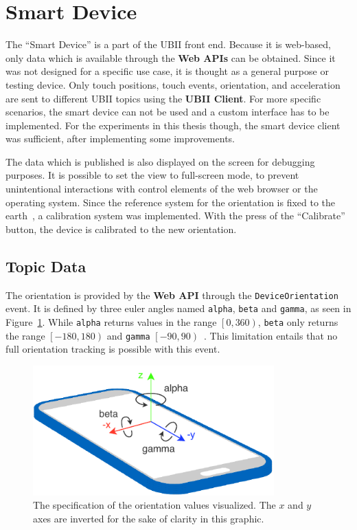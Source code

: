 \section{Smart Device}\label{section:smart-device}

The \enquote{Smart Device} is a part of the \ac{UBII} front end. Because it is web-based, only data which is available through the \textbf{Web \acp{API}} can be obtained. Since it was not designed for a specific use case, it is thought as a general purpose or testing device. Only touch positions, touch events, orientation, and acceleration are sent to different \ac{UBII} topics using the \textbf{\ac{UBII} Client}. For more specific scenarios, the smart device can not be used and a custom interface has to be implemented. For the experiments in this thesis though, the smart device client was sufficient, after implementing some improvements.

The data which is published is also displayed on the screen for debugging purposes. It is possible to set the view to full-screen mode, to prevent unintentional interactions with control elements of the web browser or the operating system. Since the reference system for the orientation is fixed to the earth~\cite[Chapter~4.1]{DevicesandSensorsWorkingGroup.2019}, a calibration system was implemented. With the press of the \enquote{Calibrate} button, the device is calibrated to the new orientation.


\subsection{Topic Data}\label{subsection:topic-data}

The orientation is provided by the \textbf{Web API} through the \lstinline{DeviceOrientation} event. It is defined by three euler angles named \lstinline{alpha}, \lstinline{beta} and \lstinline{gamma}, as seen in Figure~\ref{fig:webapi-device-orientation}.
While \lstinline{alpha} returns values in the range \(\left[0, 360\right)\), \lstinline{beta} only returns the range \(\left[-180, 180\right)\) and \lstinline{gamma} \(\left[-90, 90\right)\)~\cite[Chapter~4.1]{DevicesandSensorsWorkingGroup.2019}. %
This limitation entails that no full orientation tracking is possible with this event. 

\begin{figure}[htpb]
  \centering
  \includegraphics[height=5cm]{figures/webapi_device_orientation.pdf}
  \caption[Device coordinate system and orientation values]{The specification of the orientation values visualized. The \(x\) and \(y\) axes are inverted for the sake of clarity in this graphic.}\label{fig:webapi-device-orientation}
\end{figure}

